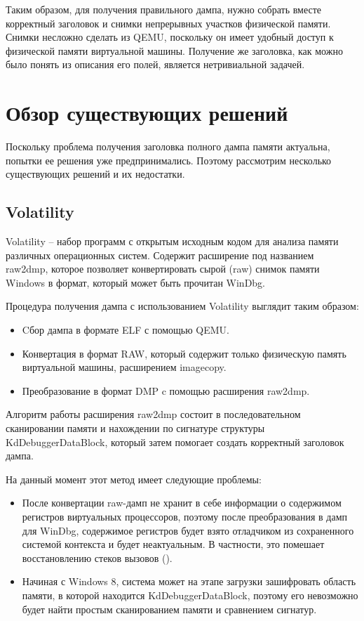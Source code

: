 \documentclass{mipt-thesis-bs}
\begin{document}
Таким образом, для получения правильного дампа, нужно собрать вместе корректный заголовок и снимки непрерывных участков физической памяти. Снимки несложно сделать из QEMU, поскольку он имеет удобный доступ к физической памяти виртуальной машины. Получение же заголовка, как можно было понять из описания его полей, является нетривиальной задачей.

\chapter{Обзор существующих решений}

Поскольку проблема получения заголовка полного дампа памяти актуальна, попытки ее решения уже предпринимались. Поэтому рассмотрим несколько существующих решений и их недостатки.

\section*{Volatility}

Volatility -- набор программ с открытым исходным кодом для анализа памяти различных операционных систем. Содержит расширение под названием raw2dmp, которое позволяет конвертировать сырой (raw) снимок памяти Windows в формат, который может быть прочитан WinDbg.

Процедура получения дампа с использованием Volatility выглядит таким образом:
\begin{itemize}
    \item Cбор дампа в формате ELF с помощью QEMU.
    \item Конвертация в формат RAW, который содержит только физическую память виртуальной машины, расширением imagecopy.
    \item Преобразование в формат DMP c помощью расширения raw2dmp\cite{lpblog}.
\end{itemize}

Алгоритм работы расширения raw2dmp состоит в последовательном сканировании памяти и нахождении по сигнатуре структуры KdDebuggerDataBlock, который затем помогает создать корректный заголовок дампа.

На данный момент этот метод имеет следующие проблемы:

\begin{itemize}
    \item После конвертации raw-дамп не хранит в себе информации о содержимом регистров виртуальных процессоров, поэтому после преобразования в дамп для WinDbg, содержимое регистров будет взято отладчиком из сохраненного системой контекста и будет неактуальным. В частности, это помешает восстановлению стеков вызовов ().
    \item Начиная с Windows 8, система может на этапе загрузки зашифровать область памяти, в которой находится KdDebuggerDataBlock, поэтому его невозможно будет найти простым сканированием памяти и сравнением сигнатур.
\end{itemize}
\end{document}
